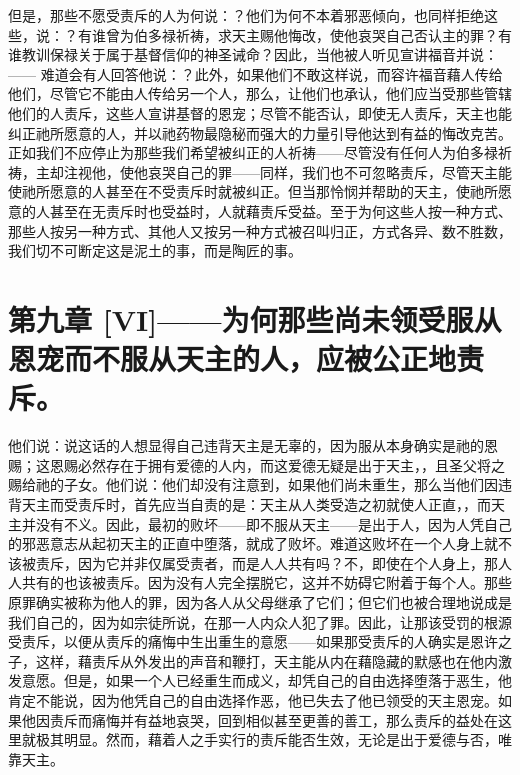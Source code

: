 但是，那些不愿受责斥的人为何说：？他们为何不本着邪恶倾向，也同样拒绝这些，说：？有谁曾为伯多禄祈祷，求天主赐他悔改，使他哀哭自己否认主的罪？有谁教训保禄关于属于基督信仰的神圣诫命？因此，当他被人听见宣讲福音并说：  —— 难道会有人回答他说：？此外，如果他们不敢这样说，而容许福音藉人传给他们，尽管它不能由人传给另一个人，那么，让他们也承认，他们应当受那些管辖他们的人责斥，这些人宣讲基督的恩宠；尽管不能否认，即使无人责斥，天主也能纠正祂所愿意的人，并以祂药物最隐秘而强大的力量引导他达到有益的悔改克苦。正如我们不应停止为那些我们希望被纠正的人祈祷——尽管没有任何人为伯多禄祈祷，主却注视他，使他哀哭自己的罪——同样，我们也不可忽略责斥，尽管天主能使祂所愿意的人甚至在不受责斥时就被纠正。但当那怜悯并帮助的天主，使祂所愿意的人甚至在无责斥时也受益时，人就藉责斥受益。至于为何这些人按一种方式、那些人按另一种方式、其他人又按另一种方式被召叫归正，方式各异、数不胜数，我们切不可断定这是泥土的事，而是陶匠的事。\par


\section{第九章 [VI]——为何那些尚未领受服从恩宠而不服从天主的人，应被公正地责斥。}

他们说：说这话的人想显得自己违背天主是无辜的，因为服从本身确实是祂的恩赐；这恩赐必然存在于拥有爱德的人内，而这爱德无疑是出于天主，，且圣父将之赐给祂的子女。他们说：他们却没有注意到，如果他们尚未重生，那么当他们因违背天主而受责斥时，首先应当自责的是：天主从人类受造之初就使人正直，，而天主并没有不义。因此，最初的败坏——即不服从天主——是出于人，因为人凭自己的邪恶意志从起初天主的正直中堕落，就成了败坏。难道这败坏在一个人身上就不该被责斥，因为它并非仅属受责者，而是人人共有吗？不，即使在个人身上，那人人共有的也该被责斥。因为没有人完全摆脱它，这并不妨碍它附着于每个人。那些原罪确实被称为他人的罪，因为各人从父母继承了它们；但它们也被合理地说成是我们自己的，因为如宗徒所说，在那一人内众人犯了罪。因此，让那该受罚的根源受责斥，以便从责斥的痛悔中生出重生的意愿——如果那受责斥的人确实是恩许之子，这样，藉责斥从外发出的声音和鞭打，天主能从内在藉隐藏的默感也在他内激发意愿。但是，如果一个人已经重生而成义，却凭自己的自由选择堕落于恶生，他肯定不能说，因为他凭自己的自由选择作恶，他已失去了他已领受的天主恩宠。如果他因责斥而痛悔并有益地哀哭，回到相似甚至更善的善工，那么责斥的益处在这里就极其明显。然而，藉着人之手实行的责斥能否生效，无论是出于爱德与否，唯靠天主。\par

